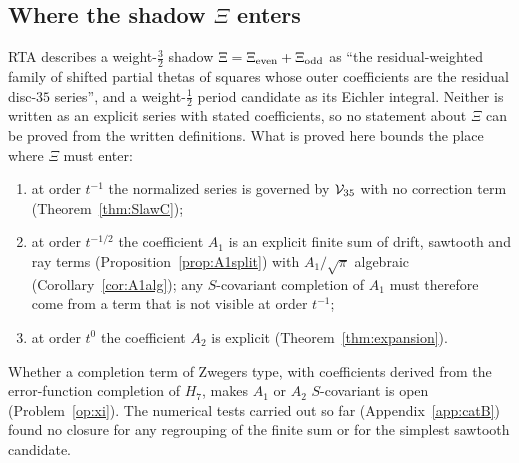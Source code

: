 \subsection{Where the shadow $\Xi$ enters}
RTA describes a weight-$\frac32$ shadow $\Xi=\Xi_{\rm even}+\Xi_{\rm odd}$ as ``the residual-weighted family of shifted partial thetas of squares whose outer coefficients are the
residual disc-$35$ series'', and a weight-$\frac12$ period candidate as its Eichler integral. Neither is written as an explicit series with stated coefficients, so no
statement about $\Xi$ can be proved from the written definitions. What is proved here bounds the place where $\Xi$ must enter:
\begin{enumerate}[label=(\roman*),leftmargin=2em]
\item at order $t^{-1}$ the normalized series is governed by $\mathcal V_{35}$ with no correction term (Theorem~\ref{thm:SlawC});
\item at order $t^{-1/2}$ the coefficient $A_1$ is an explicit finite sum of drift, sawtooth and ray terms (Proposition~\ref{prop:A1split}) with $A_1/\sqrt\pi$ algebraic
(Corollary~\ref{cor:A1alg}); any $S$-covariant completion of $A_1$ must therefore come from a term that is not visible at order $t^{-1}$;
\item at order $t^0$ the coefficient $A_2$ is explicit (Theorem~\ref{thm:expansion}).
\end{enumerate}
Whether a completion term of Zwegers type, with coefficients derived from the error-function completion of $H_7$, makes $A_1$ or $A_2$ $S$-covariant is open
(Problem~\ref{op:xi}). The numerical tests carried out so far (Appendix~\ref{app:catB}) found no closure for any regrouping of the finite sum or for the simplest sawtooth
candidate.

